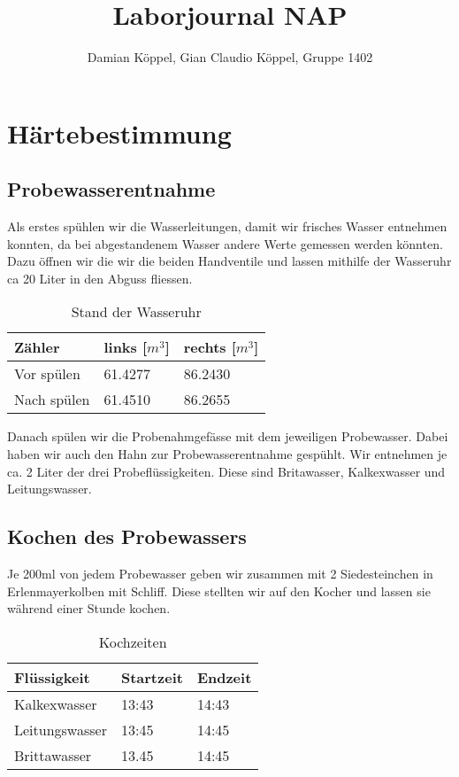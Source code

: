 \documentclass[10pt,oneside,a4paper,fleqn]{article}
\title{Laborjournal NAP}
\author{Damian Köppel, Gian Claudio Köppel, Gruppe 1402}
\begin{document}
\maketitle

\section{Härtebestimmung}
\subsection{Probewasserentnahme}
Als erstes spühlen wir die Wasserleitungen, damit wir frisches Wasser entnehmen
konnten, da bei abgestandenem Wasser andere Werte gemessen werden könnten. Dazu
öffnen wir die wir die beiden Handventile und lassen mithilfe der Wasseruhr
ca 20 Liter in den Abguss fliessen.

\begin{table}[!h]
\caption{Stand der Wasseruhr}
\label{tab:standWasseruhr}
\centering
	\begin{tabular}{|l|l|l|}
		\hline
		Zähler & links [$m^3$] & rechts [$m^3$] \\
		\hline
		Vor spülen & 61.4277 & 86.2430 \\
		\hline
		Nach spülen & 61.4510 & 86.2655 \\
		\hline
	\end{tabular}
\end{table}

Danach spülen wir die Probenahmgefässe mit dem jeweiligen Probewasser. Dabei
haben wir auch den Hahn zur Probewasserentnahme gespühlt. Wir entnehmen je ca.
2 Liter der drei Probeflüssigkeiten. Diese sind Britawasser, Kalkexwasser und
Leitungswasser.

\subsection{Kochen des Probewassers}
Je 200ml von jedem Probewasser geben wir zusammen mit 2 Siedesteinchen in
Erlenmayerkolben mit Schliff. Diese stellten wir auf den Kocher und lassen sie
während einer Stunde kochen.

\begin{table}[!h]
\caption{Kochzeiten}
\label{tab:kochzeiten}
\centering
	\begin{tabular}{|l|l|l|}
		\hline
		Flüssigkeit & Startzeit & Endzeit \\
		\hline
		Kalkexwasser & 13:43 & 14:43 \\
		\hline
		Leitungswasser & 13:45 & 14:45 \\
		\hline
		Brittawasser & 13.45 & 14:45 \\
		\hline
	\end{tabular}
\end{table}
\end{document}
